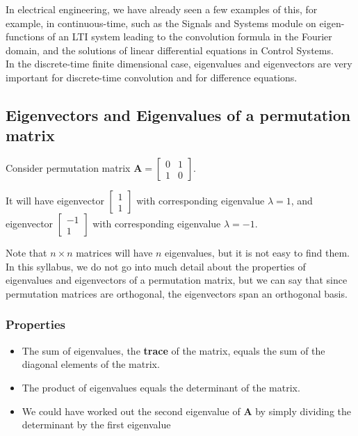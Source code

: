 In electrical engineering, we have already seen a few examples of this, for example, in continuous-time, such as the Signals and Systems module on eigen-functions of an LTI system leading to the convolution formula in the Fourier domain, and the solutions of linear differential equations in Control Systems.\\

In the discrete-time finite dimensional case, eigenvalues and eigenvectors are very important for discrete-time convolution and for difference equations.\\

\subsection{Eigenvectors and Eigenvalues of a permutation matrix}

Consider permutation matrix $\textbf{A} = \begin{bmatrix}
    0 & 1 \\ 1 & 0
\end{bmatrix}$.

It will have eigenvector $\begin{bmatrix}
    1\\1
\end{bmatrix}$ with corresponding eigenvalue $\lambda = 1$, and eigenvector $\begin{bmatrix}
    -1\\1
\end{bmatrix}$ with corresponding eigenvalue $\lambda = -1$.

Note that $n\times n$ matrices will have $n$ eigenvalues, but it is not easy to find them. In this syllabus, we do not go into much detail about the properties of eigenvalues and eigenvectors of a permutation matrix, but we can say that since permutation matrices are orthogonal, the eigenvectors span an orthogonal basis.\\

\subsubsection*{Properties}
\begin{itemize}
    \item The sum of eigenvalues, the \textbf{trace} of the matrix, equals the sum of the diagonal elements of the matrix.
    \item The product of eigenvalues equals the determinant of the matrix.
    \item We could have worked out the second eigenvalue of \textbf{A} by simply dividing the determinant by the first eigenvalue
\end{itemize}

